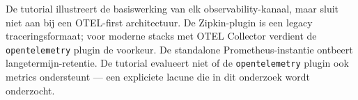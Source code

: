 De tutorial illustreert de basiswerking van elk observability-kanaal, maar sluit niet aan bij een OTEL-first architectuur. De Zipkin-plugin is een legacy traceringsformaat; voor moderne stacks met OTEL Collector verdient de \texttt{opentelemetry} plugin de voorkeur. De standalone Prometheus-instantie ontbeert langetermijn-retentie. De tutorial evalueert niet of de \texttt{opentelemetry} plugin ook metrics ondersteunt --- een expliciete lacune die in dit onderzoek wordt onderzocht.
